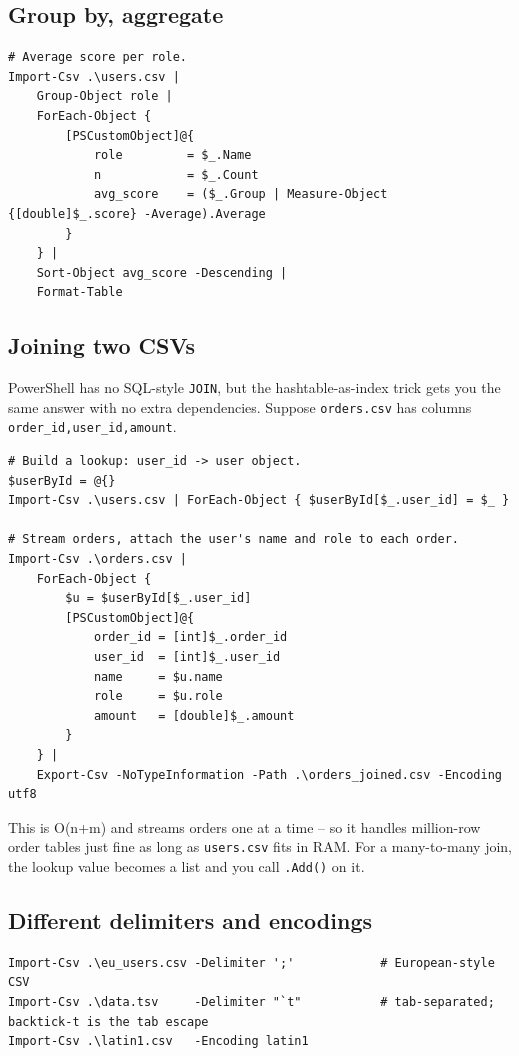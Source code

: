 \documentclass[11pt,a4paper]{article}
\begin{document}
\subsection*{Group by, aggregate}

\begin{lstlisting}[style=pwshstyle]
# Average score per role.
Import-Csv .\users.csv |
    Group-Object role |
    ForEach-Object {
        [PSCustomObject]@{
            role         = $_.Name
            n            = $_.Count
            avg_score    = ($_.Group | Measure-Object {[double]$_.score} -Average).Average
        }
    } |
    Sort-Object avg_score -Descending |
    Format-Table
\end{lstlisting}

\subsection*{Joining two CSVs}

PowerShell has no SQL-style \texttt{JOIN}, but the hashtable-as-index
trick gets you the same answer with no extra dependencies. Suppose
\texttt{orders.csv} has columns \texttt{order\_id,user\_id,amount}.

\begin{lstlisting}[style=pwshstyle]
# Build a lookup: user_id -> user object.
$userById = @{}
Import-Csv .\users.csv | ForEach-Object { $userById[$_.user_id] = $_ }

# Stream orders, attach the user's name and role to each order.
Import-Csv .\orders.csv |
    ForEach-Object {
        $u = $userById[$_.user_id]
        [PSCustomObject]@{
            order_id = [int]$_.order_id
            user_id  = [int]$_.user_id
            name     = $u.name
            role     = $u.role
            amount   = [double]$_.amount
        }
    } |
    Export-Csv -NoTypeInformation -Path .\orders_joined.csv -Encoding utf8
\end{lstlisting}

This is O(n+m) and streams orders one at a time -- so it handles
million-row order tables just fine as long as \texttt{users.csv} fits
in RAM. For a many-to-many join, the lookup value becomes a list and
you call \texttt{.Add()} on it.

\subsection*{Different delimiters and encodings}

\begin{lstlisting}[style=pwshstyle]
Import-Csv .\eu_users.csv -Delimiter ';'            # European-style CSV
Import-Csv .\data.tsv     -Delimiter "`t"           # tab-separated; backtick-t is the tab escape
Import-Csv .\latin1.csv   -Encoding latin1
\end{lstlisting}
\end{document}
